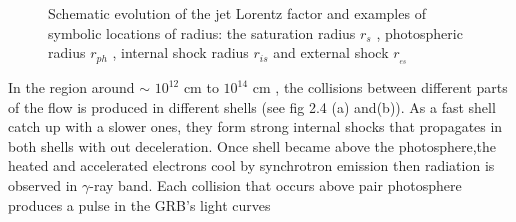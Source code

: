 \begin{figure}[hpbt]
\caption{Schematic evolution of the jet Lorentz factor and examples of symbolic locations of radius: the saturation radius $r_{s} $ , photospheric radius $r_{ph} $ , internal shock radius $ r_{is} $ and external shock $ r_{_{es}} $}
\label{GRB prompt emission}
\end{figure}
In the region around $ \sim $ $ 10^{12} $ cm to  $ 10^{14} $ cm , the collisions between different parts of the flow is produced in different shells (see fig 2.4 (a) and(b)). As a fast shell catch up with a slower ones, they form strong internal shocks that propagates in both shells with out deceleration. Once shell became above the photosphere,the heated and accelerated electrons cool by synchrotron emission then radiation is observed in $ \gamma $-ray band. Each collision that occurs above pair photosphere produces a pulse in the GRB’s light curves\citep{22}\\\\
